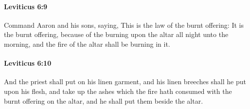 		\paragraph{Leviticus 6:9} %
			\label{LEVITICUS-6-9}

			Command Aaron and his sons, saying, This is the law of the burnt offering: It is the burnt offering, because of the burning upon the altar all night unto the morning, and the fire of the altar shall be burning in it.


		\paragraph{Leviticus 6:10} %
			\label{LEVITICUS-6-10}

			And the priest shall put on his linen garment, and his linen breeches shall he put upon his flesh, and take up the ashes which the fire hath consumed with the burnt offering on the altar, and he shall put them beside the altar.

